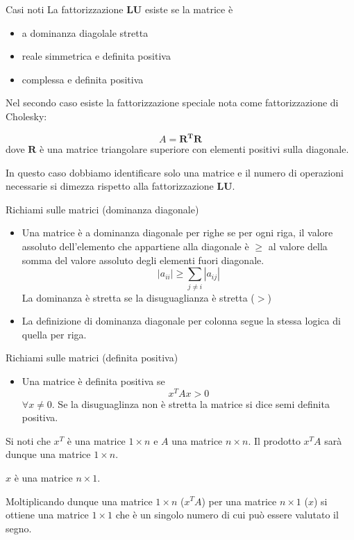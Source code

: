 \begin{frame}{Casi noti}
\label{casi-noti}
La fattorizzazione \(\mathbf{LU}\) esiste se la matrice è

\begin{itemize}
\item
  a dominanza diagolale stretta
\item
  reale simmetrica e definita positiva
\item
  complessa e definita positiva
\end{itemize}

Nel secondo caso esiste la fattorizzazione speciale nota come
fattorizzazione di Cholesky:

\[A=\mathbf{R^TR}\] dove \(\mathbf{R}\) è una matrice triangolare
superiore con elementi positivi sulla diagonale.

In questo caso dobbiamo identificare solo una matrice e il numero di
operazioni necessarie si dimezza rispetto alla fattorizzazione
\(\mathbf{LU}\).
\end{frame}

\begin{frame}{Richiami sulle matrici (dominanza diagonale)}
\label{richiami-sulle-matrici-dominanza-diagonale}
\begin{itemize}
 
\item
  Una matrice è a dominanza diagonale per righe se per ogni riga, il
  valore assoluto dell'elemento che appartiene alla diagonale è \(\ge\)
  al valore della somma del valore assoluto degli elementi fuori
  diagonale. \[|a_{ii}|\ge \sum_{j\ne i} |a_{ij}|\] La dominanza è
  stretta se la disuguaglianza è stretta (\(>\))
\item
  La definizione di dominanza diagonale per colonna segue la stessa
  logica di quella per riga.
\end{itemize}
\end{frame}

\begin{frame}{Richiami sulle matrici (definita positiva)}
\label{richiami-sulle-matrici-definita-positiva}
\begin{itemize}
 
\item
  Una matrice è definita positiva se \[x^TAx>0\] \(\forall x\ne0\). Se
  la disuguaglinza non è stretta la matrice si dice semi definita
  positiva.
\end{itemize}

\vskip1cm

Si noti che \(x^T\) è una matrice \(1\times n\) e \(A\) una matrice
\(n\times n\). Il prodotto \(x^TA\) sarà dunque una matrice
\(1\times n\).

\(x\) è una matrice \(n\times 1\).

Moltiplicando dunque una matrice \(1\times n\) (\(x^TA\)) per una
matrice \(n\times 1\) (\(x\)) si ottiene una matrice \(1\times 1\) che è
un singolo numero di cui può essere valutato il segno.
\end{frame}

